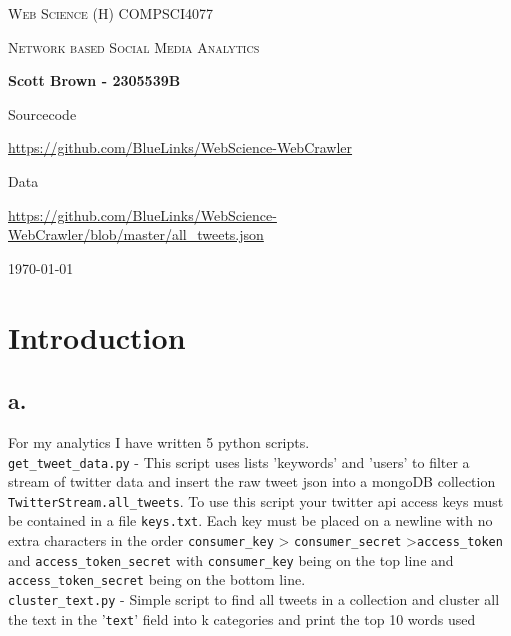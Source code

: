 \documentclass[10pt,a4paper]{article}
\begin{document}
\begin{titlepage}
	\centering
	{\scshape\LARGE Web Science (H) COMPSCI4077 \par}
	\vspace{1cm}
	{\scshape\Large Network based Social Media Analytics\par}
	\vspace{1.5cm}
	{\huge\bfseries Scott Brown - 2305539B \par}
	\vspace{2cm}
	{\Large Sourcecode\par}
	{\Large \url{https://github.com/BlueLinks/WebScience-WebCrawler}\par}
	\vspace{2cm}
	{\Large Data\par}
	{\Large \url{https://github.com/BlueLinks/WebScience-WebCrawler/blob/master/all_tweets.json}\par}
	\vfill

	{\large \today\par}
	
\end{titlepage}

\section{Introduction}
\subsection*{a.}
For my analytics I have written 5 python scripts. \\

	\verb|get_tweet_data.py| - This script uses lists 'keywords' and 'users' to filter a stream of twitter data and insert the raw tweet json into a mongoDB collection \verb|TwitterStream.all_tweets|. To use this script your twitter api access keys must be contained in a file \verb|keys.txt|. Each key must be placed on a newline with no extra characters in the order \verb|consumer_key| > \verb|consumer_secret| >\verb|access_token| and \verb|access_token_secret| with \verb|consumer_key| being on the top line and \verb|access_token_secret| being on the bottom line. \\
	
	\verb|cluster_text.py| - Simple script to find all tweets in a collection and cluster all the text in the '\verb|text|' field into k categories and print the top 10 words used \\
	
\end{document}
